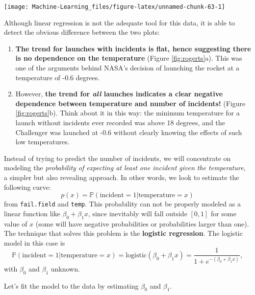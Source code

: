 \documentclass[]{book}
\providecommand{\tightlist}{%
  \setlength{\itemsep}{0pt}\setlength{\parskip}{0pt}}
\theoremstyle{definition}
\theoremstyle{definition}
\theoremstyle{definition}
\theoremstyle{remark}
\begin{document}
\begin{center}\texttt{[image: Machine-Learning\_files/figure-latex/unnamed-chunk-63-1]} \end{center}

Although linear regression is not the adequate tool for this data, it is
able to detect the obvious difference between the two plots:

\begin{enumerate}
\def\labelenumi{\arabic{enumi}.}
\tightlist
\item
  \textbf{The trend for launches with incidents is flat, hence
  suggesting there is no dependence on the temperature} (Figure
  \ref{fig:rogerts}a). This was one of the arguments behind NASA's
  decision of launching the rocket at a temperature of -0.6 degrees.
\item
  However, \textbf{the trend for \emph{all} launches indicates a clear
  negative dependence between temperature and number of incidents!}
  (Figure \ref{fig:rogerts}b). Think about it in this way: the minimum
  temperature for a launch without incidents ever recorded was above 18
  degrees, and the Challenger was launched at -0.6 without clearly
  knowing the effects of such low temperatures.
\end{enumerate}

Instead of trying to predict the number of incidents, we will
concentrate on modeling the \emph{probability of expecting at least one
incident given the temperature}, a simpler but also revealing approach.
In other words, we look to estimate the following curve: \[
p(x)=\mathbb{P}(\text{incident}=1|\text{temperature}=x)
\] from \texttt{fail.field} and \texttt{temp}. This probability can not
be properly modeled as a linear function like \(\beta_0+\beta_1x\),
since inevitably will fall outside \([0,1]\) for some value of \(x\)
(some will have negative probabilities or probabilities larger than
one). The technique that solves this problem is the \textbf{logistic
regression}. The logistic model in this case is \[
\mathbb{P}(\text{incident}=1|\text{temperature}=x)=\text{logistic}\left(\beta_0+\beta_1x\right)=\frac{1}{1+e^{-(\beta_0+\beta_1x)}},
\] with \(\beta_0\) and \(\beta_1\) unknown.

Let's fit the model to the data by estimating \(\beta_0\) and
\(\beta_1\).
\end{document}
